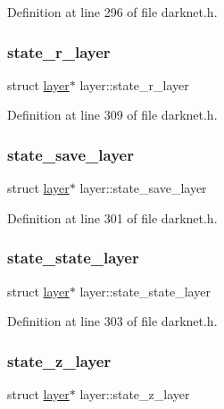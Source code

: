 Definition at line 296 of file darknet.\+h.

\mbox{\label{structlayer_a2ce6e1f069b4ebc57b4a49d56afbe875}} 
\subsubsection{\texorpdfstring{state\_r\_layer}{state\_r\_layer}}
{\footnotesize\ttfamily struct \mbox{\hyperlink{structlayer}{layer}}$\ast$ layer\+::state\+\_\+r\+\_\+layer}



Definition at line 309 of file darknet.\+h.

\mbox{\label{structlayer_a5258c642da20d6011c579edc4d1efe03}} 
\subsubsection{\texorpdfstring{state\_save\_layer}{state\_save\_layer}}
{\footnotesize\ttfamily struct \mbox{\hyperlink{structlayer}{layer}}$\ast$ layer\+::state\+\_\+save\+\_\+layer}



Definition at line 301 of file darknet.\+h.

\mbox{\label{structlayer_a2c2e848a9857ec5f5fd2b6205b2e963f}} 
\subsubsection{\texorpdfstring{state\_state\_layer}{state\_state\_layer}}
{\footnotesize\ttfamily struct \mbox{\hyperlink{structlayer}{layer}}$\ast$ layer\+::state\+\_\+state\+\_\+layer}



Definition at line 303 of file darknet.\+h.

\mbox{\label{structlayer_a22598554a0e6c65dd6e6fb2246ceb6cf}} 
\subsubsection{\texorpdfstring{state\_z\_layer}{state\_z\_layer}}
{\footnotesize\ttfamily struct \mbox{\hyperlink{structlayer}{layer}}$\ast$ layer\+::state\+\_\+z\+\_\+layer}



